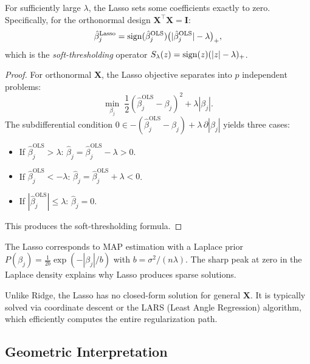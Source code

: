 \begin{theorem}
For sufficiently large $\lambda$, the Lasso sets some coefficients exactly to zero. Specifically, for the orthonormal design $\bm{X}^\top\bm{X} = \bm{I}$:
\[
    \hat{\beta}_j^{\text{Lasso}} = \mathrm{sign}(\hat{\beta}_j^{\text{OLS}})\bigl(|\hat{\beta}_j^{\text{OLS}}| - \lambda\bigr)_+,
\]
which is the \emph{soft-thresholding} operator $S_\lambda(z) = \mathrm{sign}(z)(|z|-\lambda)_+$.
\end{theorem}

\begin{proof}
For orthonormal $\bm{X}$, the Lasso objective separates into $p$ independent problems:
\[
    \min_{\beta_j}\;\frac{1}{2}(\hat{\beta}_j^{\text{OLS}} - \beta_j)^2 + \lambda|\beta_j|.
\]
The subdifferential condition $0 \in -(\hat{\beta}_j^{\text{OLS}}-\beta_j) + \lambda\,\partial|\beta_j|$ yields three cases:
\begin{itemize}
    \item If $\hat{\beta}_j^{\text{OLS}} > \lambda$: $\hat{\beta}_j = \hat{\beta}_j^{\text{OLS}} - \lambda > 0$.
    \item If $\hat{\beta}_j^{\text{OLS}} < -\lambda$: $\hat{\beta}_j = \hat{\beta}_j^{\text{OLS}} + \lambda < 0$.
    \item If $|\hat{\beta}_j^{\text{OLS}}| \leq \lambda$: $\hat{\beta}_j = 0$.
\end{itemize}
This produces the soft-thresholding formula.
\end{proof}

\begin{proposition}
The Lasso corresponds to MAP estimation with a Laplace prior $P(\beta_j) = \frac{1}{2b}\exp(-|\beta_j|/b)$ with $b = \sigma^2/(n\lambda)$. The sharp peak at zero in the Laplace density explains why Lasso produces sparse solutions.
\end{proposition}

\begin{remark}
Unlike Ridge, the Lasso has no closed-form solution for general $\bm{X}$. It is typically solved via coordinate descent or the LARS (Least Angle Regression) algorithm, which efficiently computes the entire regularization path.
\end{remark}

\subsection{Geometric Interpretation}

